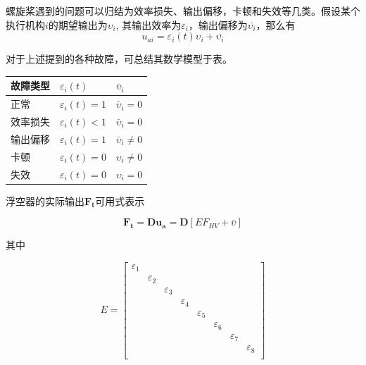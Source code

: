螺旋桨遇到的问题可以归结为效率损失、输出偏移，卡顿和失效等几类。假设某个执行机构$i$的期望输出为$\upsilon_i$, 其输出效率为$\varepsilon_i$，输出偏移为$\bar{\upsilon_i}$，那么有
\begin{equation}\label{eq:outputeff}
    u_{ai} = \varepsilon_i(t)\upsilon_i+\bar{\upsilon_i}
\end{equation}

对于上述提到的各种故障，可总结其数学模型于表。
\begin{table}[ht]
    \centering
	\vspace{0.5em}
	\begin{tabular}{lll}
		\toprule
		故障类型&$\varepsilon_i(t)$&$\bar{\upsilon}_i$ \\
		\midrule
		正常&$\varepsilon_i(t)=1$&$\bar{\upsilon}_i=0$\\
		效率损失&$\varepsilon_i(t)<1$&$\bar{\upsilon}_i=0$\\
		输出偏移&$\varepsilon_i(t)=1$&$\bar{\upsilon}_i\neq0$\\
		卡顿&$\varepsilon_i(t)=0$&$\upsilon_i\neq0$\\
		失效&$\varepsilon_i(t)=0$&$\upsilon_i=0$\\
		\bottomrule
	\end{tabular}
\end{table}

浮空器的实际输出$\mathbf{F_t}$可用式表示

\begin{equation}\label{eq:inputtrans}
    \mathbf{F_t} = \mathbf{Du_a} = \mathbf{D}[EF_{HV} + \bar{\upsilon}]
\end{equation}

其中

\begin{equation*}
    E = \left[\begin{matrix}
    \varepsilon_1&&&&&&&\\
    &\varepsilon_2&&&&&&\\
    &&\varepsilon_3&&&&&\\
    &&&\varepsilon_4&&&&\\
    &&&&\varepsilon_5&&&\\
    &&&&&\varepsilon_6&&\\
    &&&&&&\varepsilon_7&\\
    &&&&&&&\varepsilon_8\\
    \end{matrix}\right]
\end{equation*}

